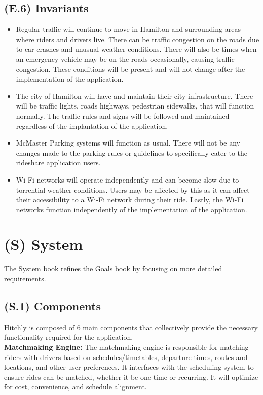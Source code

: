 \documentclass[12pt,letterpaper]{article}
\begin{document}
\subsection{(E.6) Invariants}
\begin{itemize}
\item Regular traffic will continue to move in Hamilton and surrounding areas where riders and drivers live. There can be traffic congestion on the roads due to car crashes and unusual weather conditions. There will also be times when an emergency vehicle may be on the roads occasionally, causing traffic congestion. These conditions will be present and will not change after the implementation of the application.  
\item The city of Hamilton will have and maintain their city infrastructure. There will be traffic lights, roads highways, pedestrian sidewalks, that will function normally.  The traffic rules and signs will be followed and maintained regardless of the implantation of the application. 
\item McMaster Parking systems will function as usual. There will not be any changes made to the parking rules or guidelines to specifically cater to the rideshare application users. 
\item Wi-Fi networks will operate independently and can become slow due to torrential weather conditions. Users may be affected by this as it can affect their accessibility to a Wi-Fi network during their ride. Lastly, the Wi-Fi networks function independently of the implementation of the application.  
\end{itemize}

\clearpage

\section{(S) System}
The System book refines the Goals book by focusing on more detailed requirements.

\subsection{(S.1) Components}
Hitchly is composed of 6 main components that collectively provide the necessary functionality required for the application. \\

\noindent \textbf{Matchmaking Engine:} The matchmaking engine is responsible for matching riders with drivers based on schedules/timetables, departure times, routes and locations, and other user preferences. 
It interfaces with the scheduling system to ensure rides can be matched, whether it be one-time or recurring. It will optimize for cost, convenience, and schedule alignment. \\
\end{document}
